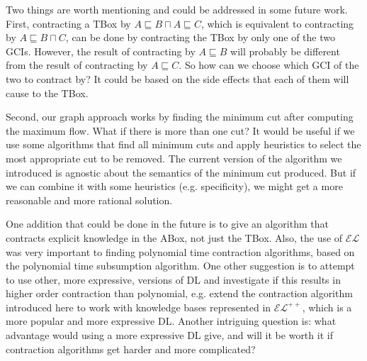 Two things are worth mentioning and could be addressed in some future work. First, contracting a TBox by $A \sqsubseteq B \sqcap A \sqsubseteq C$, which is equivalent to contracting by $A \sqsubseteq B \sqcap C$, can be done by contracting the TBox by only one of the two GCIs. However, the result of contracting by $A \sqsubseteq B$ will probably be different from the result of contracting by $A \sqsubseteq C$. So how can we choose which GCI of the two to contract by? It could be based on the side effects that each of them will cause to the TBox.

Second, our graph approach works by finding the minimum cut after computing the maximum flow. What if there is more than one cut? It would be useful if we use some algorithms that find all minimum cuts and apply heuristics to select the most appropriate cut to be removed. The current version of the algorithm we introduced is agnostic about the semantics of the minimum cut produced. But if we can combine it with some heuristics (e.g. specificity), we might get a more reasonable and more rational solution.

One addition that could be done in the future is to give an algorithm that contracts explicit knowledge in the ABox, not just the TBox. Also, the use of $\mathcal{EL}$ was very important to finding polynomial time contraction algorithms, based on the polynomial time subsumption algorithm. One other suggestion is to attempt to use other, more expressive, versions of DL and investigate if this results in higher order contraction than polynomial, e.g. extend the contraction algorithm introduced here to work with knowledge bases represented in $\mathcal{EL}^{++}$, which is a more popular and more expressive DL. Another intriguing question is: what advantage would using a more expressive DL give, and will it be worth it if contraction algorithms get harder and more complicated? 